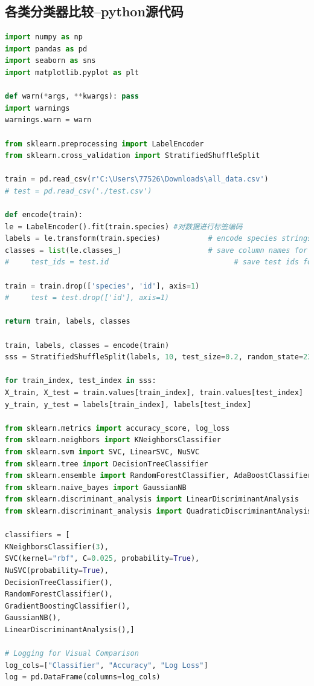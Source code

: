 \documentclass{whutmod}
\begin{document}
\subsection{各类分类器比较--python源代码}
\begin{lstlisting}[language=python]%这里修改语言
import numpy as np
import pandas as pd
import seaborn as sns
import matplotlib.pyplot as plt

def warn(*args, **kwargs): pass
import warnings
warnings.warn = warn

from sklearn.preprocessing import LabelEncoder
from sklearn.cross_validation import StratifiedShuffleSplit

train = pd.read_csv(r'C:\Users\77526\Downloads\all_data.csv')
# test = pd.read_csv('./test.csv')

def encode(train):
le = LabelEncoder().fit(train.species) #对数据进行标签编码
labels = le.transform(train.species)           # encode species strings
classes = list(le.classes_)                    # save column names for submission
#     test_ids = test.id                             # save test ids for submission

train = train.drop(['species', 'id'], axis=1)
#     test = test.drop(['id'], axis=1)

return train, labels, classes

train, labels, classes = encode(train)
sss = StratifiedShuffleSplit(labels, 10, test_size=0.2, random_state=23)

for train_index, test_index in sss:
X_train, X_test = train.values[train_index], train.values[test_index]
y_train, y_test = labels[train_index], labels[test_index]

from sklearn.metrics import accuracy_score, log_loss
from sklearn.neighbors import KNeighborsClassifier
from sklearn.svm import SVC, LinearSVC, NuSVC
from sklearn.tree import DecisionTreeClassifier
from sklearn.ensemble import RandomForestClassifier, AdaBoostClassifier, GradientBoostingClassifier
from sklearn.naive_bayes import GaussianNB
from sklearn.discriminant_analysis import LinearDiscriminantAnalysis
from sklearn.discriminant_analysis import QuadraticDiscriminantAnalysis

classifiers = [
KNeighborsClassifier(3),
SVC(kernel="rbf", C=0.025, probability=True),
NuSVC(probability=True),
DecisionTreeClassifier(),
RandomForestClassifier(),
GradientBoostingClassifier(),
GaussianNB(),
LinearDiscriminantAnalysis(),]

# Logging for Visual Comparison
log_cols=["Classifier", "Accuracy", "Log Loss"]
log = pd.DataFrame(columns=log_cols)


\end{lstlisting}
\end{document}
